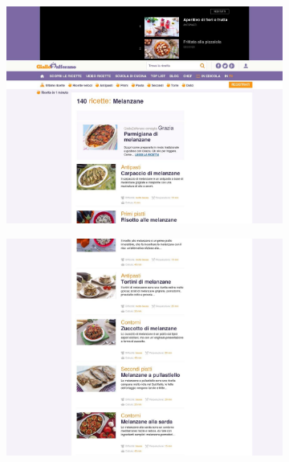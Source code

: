 \begin{figure}[h!]
	\centering
	\begin{subfigure}[b]{0.4\textwidth}
		\includegraphics[scale=0.1]{images/risultati/risultati-0.jpeg}
		\subcaption{}
	\end{subfigure}
	\begin{subfigure}[b]{0.4\textwidth}
		\includegraphics[scale=0.1]{images/risultati/risultati-1.jpeg}
		\subcaption{}
	\end{subfigure}
	\begin{subfigure}[b]{0.4\textwidth}

\end{subfigure}
\end{figure}

